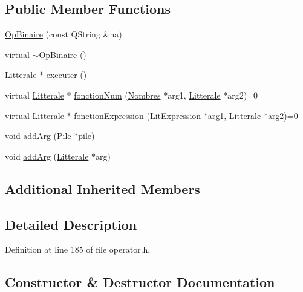 \subsection*{Public Member Functions}
\begin{DoxyCompactItemize}
\item 
\hyperlink{class_op_binaire_ac70aab4bf3d8f220bcb164027b4bb404}{Op\+Binaire} (const Q\+String \&na)
\item 
virtual \hyperlink{class_op_binaire_af92a746a738f8f56ca1e402d3c2b529b}{$\sim$\+Op\+Binaire} ()
\item 
\hyperlink{class_litterale}{Litterale} $\ast$ \hyperlink{class_op_binaire_aa81570ae3aeb44b9533e7ddd82a397be}{executer} ()
\item 
virtual \hyperlink{class_litterale}{Litterale} $\ast$ \hyperlink{class_op_binaire_afb16dbd5f455b97afb5c07fae29b94fc}{fonction\+Num} (\hyperlink{class_nombres}{Nombres} $\ast$arg1, \hyperlink{class_litterale}{Litterale} $\ast$arg2)=0
\item 
virtual \hyperlink{class_litterale}{Litterale} $\ast$ \hyperlink{class_op_binaire_a72ea45bf3157516edeca687668d83b32}{fonction\+Expression} (\hyperlink{class_lit_expression}{Lit\+Expression} $\ast$arg1, \hyperlink{class_litterale}{Litterale} $\ast$arg2)=0
\item 
void \hyperlink{class_op_binaire_ac48be97498d47266542ff81c86c1a118}{add\+Arg} (\hyperlink{class_pile}{Pile} $\ast$pile)
\item 
void \hyperlink{class_op_binaire_af39b73a32c35ed7722fac1d380b92bbd}{add\+Arg} (\hyperlink{class_litterale}{Litterale} $\ast$arg)
\end{DoxyCompactItemize}
\subsection*{Additional Inherited Members}


\subsection{Detailed Description}


Definition at line 185 of file operator.\+h.



\subsection{Constructor \& Destructor Documentation}
